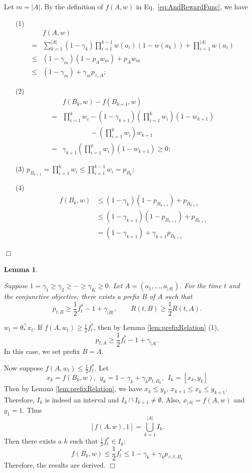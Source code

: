 \documentclass{article}
\newcommand{\abs}[1]{\left| #1 \right|}
\newtheorem{lemma}[theorem]{Lemma}%
\newenvironment{proof}{\noindent {\textbf{Proof. }}}{$\Box$ \medskip}
\newcommand{\CLemmaPrefixExi}{
	Suppose $1 = \gamma_1 \geq \gamma_2 \geq \cdots \geq \gamma_K \geq 0$. Let $A = (a_1, ..., a_{\abs{A}})$. For the time $t$ and the conjunctive objective, there exists a prefix $B$ of $A$ such that 
	$$
	p_{t, B} \geq \frac{1}{2}f_{t}^{\ast} - 1 + \gamma_{\abs{B}}, \qquad R(t, B) \geq \frac{1}{2} R(t, A).
	$$ 
}
\begin{document}
\begin{proof}
	Let $m = |A|$. By the definition of $f(A,w)$ in Eq.~\eqref{eq:AndRewardFunc}, we have
	\begin{itemize}
		\item[(1)]
		\begin{align*}
		&f(A,w) \\
		=& \sum_{k = 1}^{\abs{A}} (1-\gamma_k) \prod_{i = 1}^{k - 1} w(a_i) (1 - w(a_k)) + \prod_{i=1}^{\abs{A}}w(a_i) \\
		\leq& (1-\gamma_m)(1 - p_{A} w_m) + p_{A} w_m \\
		\leq& (1-\gamma_m) + \gamma_m p_{\wedge, A};
		\end{align*}
		
		\item[(2)]
		\begin{align*}
		&f(B_k, w) - f(B_{k+1}, w)\\
		=&\prod_{i=1}^{k}w_i - (1-\gamma_{k+1}) (\prod_{i=1}^{k}w_i) (1 - w_{k+1}) \\
		&\qquad \qquad - (\prod_{i=1}^{k}w_i) w_{k+1}\\
		=&\gamma_{k+1} (\prod_{i=1}^{k}w_i) (1 - w_{k+1}) \geq 0;
		\end{align*}
		
		\item[(3)]
		$p_{B_{k+1}} = \prod_{i=1}^{k} w_i \leq \prod_{i=1}^{k-1} w_i = p_{B_k}$;
		
		\item[(4)]
		\begin{align*}
		f(B_k, w) & \leq (1-\gamma_k) (1 - p_{B_{k+1}}) + p_{B_{k+1}}\\
		&\leq (1-\gamma_{k+1}) (1 - p_{B_{k+1}}) + p_{B_{k+1}} \\
		&= (1-\gamma_{k+1}) + \gamma_{k+1} p_{B_{k+1}}
		\end{align*}
	\end{itemize}
\end{proof}

\begin{lemma} %
	\label{lem:prefixexists}
	\CLemmaPrefixExi
\end{lemma}
\begin{proof}
	$w_t = \theta_*^{\top} x_t$. If $f(A, w_t) \geq \frac{1}{2} f_{t}^{\ast}$, then by Lemma \ref{lem:prefixRelation} (1),
	$$
	p_{t, A} \geq \frac{1}{2} f_{t}^{\ast} - 1 + \gamma_{\abs{A}}.
	$$
	In this case, we set prefix $B = A$.
	
	Now suppose $f(A, w_t) \leq \frac{1}{2} f_{t}^{\ast}$. Let
	$$
	x_k = f(B_k,w), ~~ y_k = 1 - \gamma_k + \gamma_k p_{t,B_k}, ~~I_k = [x_k, y_k]
	$$
	Then by Lemma \ref{lem:prefixRelation}, we have $x_k \leq y_k$, $x_{k+1} \leq x_k \leq y_{k+1}$. Therefore, $I_k$ is indeed an interval and $I_k \cap I_{k+1} \neq \emptyset$. Also, $x_{\abs{A}} = f(A, w)$ and $y_1 = 1$. Thus
	$$
	[f(A,w), 1] = \bigcup_{k=1}^{\abs{A}} I_k.
	$$
	Then there exists a $k$ such that $\frac{1}{2}f_{t}^{\ast} \in I_k$:
	$$
	f(B_k,w) \leq \frac{1}{2}f_{t}^{\ast} \leq 1 - \gamma_k + \gamma_k p_{\wedge, t, B_k}
	$$
	Therefore, the results are derived.
\end{proof}
\end{document}
